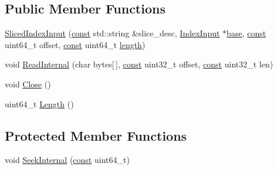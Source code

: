 \subsection*{Public Member Functions}
\begin{DoxyCompactItemize}
\item 
\mbox{\hyperlink{classlucene_1_1core_1_1store_1_1BufferedIndexInput_1_1SlicedIndexInput_a933e246d7fe6cf113f0687c5da37b79a}{Sliced\+Index\+Input}} (\mbox{\hyperlink{ZlibCrc32_8h_a2c212835823e3c54a8ab6d95c652660e}{const}} std\+::string \&slice\+\_\+desc, \mbox{\hyperlink{classlucene_1_1core_1_1store_1_1IndexInput}{Index\+Input}} $\ast$\mbox{\hyperlink{classlucene_1_1core_1_1store_1_1BufferedIndexInput_1_1SlicedIndexInput_a6d131ffd7aa3ade38037f63e14f3e89a}{base}}, \mbox{\hyperlink{ZlibCrc32_8h_a2c212835823e3c54a8ab6d95c652660e}{const}} uint64\+\_\+t offset, \mbox{\hyperlink{ZlibCrc32_8h_a2c212835823e3c54a8ab6d95c652660e}{const}} uint64\+\_\+t \mbox{\hyperlink{classlucene_1_1core_1_1store_1_1BufferedIndexInput_1_1SlicedIndexInput_a57edb1c87b6063d4bfe1d3c6b1e7629c}{length}})
\item 
void \mbox{\hyperlink{classlucene_1_1core_1_1store_1_1BufferedIndexInput_1_1SlicedIndexInput_a0f48d50c8c60eceddd88bbdb29c5eee0}{Read\+Internal}} (char bytes\mbox{[}$\,$\mbox{]}, \mbox{\hyperlink{ZlibCrc32_8h_a2c212835823e3c54a8ab6d95c652660e}{const}} uint32\+\_\+t offset, \mbox{\hyperlink{ZlibCrc32_8h_a2c212835823e3c54a8ab6d95c652660e}{const}} uint32\+\_\+t len)
\item 
void \mbox{\hyperlink{classlucene_1_1core_1_1store_1_1BufferedIndexInput_1_1SlicedIndexInput_abb75cb398fdd503e67eeca9c057cc604}{Close}} ()
\item 
uint64\+\_\+t \mbox{\hyperlink{classlucene_1_1core_1_1store_1_1BufferedIndexInput_1_1SlicedIndexInput_ac457a7bc82d7ee2b1614a79afdf13aab}{Length}} ()
\end{DoxyCompactItemize}
\subsection*{Protected Member Functions}
\begin{DoxyCompactItemize}
\item 
void \mbox{\hyperlink{classlucene_1_1core_1_1store_1_1BufferedIndexInput_1_1SlicedIndexInput_ad30088ab555e9bc4fb5f180d57ca228d}{Seek\+Internal}} (\mbox{\hyperlink{ZlibCrc32_8h_a2c212835823e3c54a8ab6d95c652660e}{const}} uint64\+\_\+t)
\end{DoxyCompactItemize}
